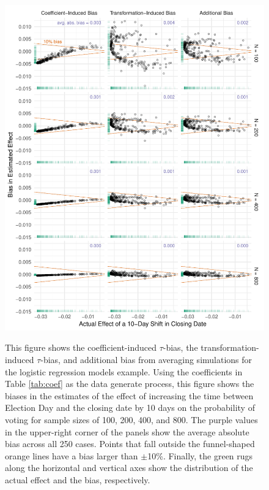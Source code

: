 \documentclass[11pt]{article}
\begin{document}
\begin{figure}[h]
\begin{center}
\includegraphics[scale = 0.75]{figs/nagler-fd-bias.pdf}\\
\vspace{.1in}
\caption{This figure shows the coefficient-induced $\tau$-bias, the transformation-induced $\tau$-bias, and additional bias from averaging simulations for the logistic regression models example. Using the coefficients in Table \ref{tab:coef} as the data generate process, this figure shows the biases in the estimates of the effect of increasing the time between Election Day and the closing date by 10 days on the probability of voting for sample sizes of 100, 200, 400, and 800. The purple values in the upper-right corner of the panels show the average absolute bias across all 250 cases. Points that fall outside the funnel-shaped orange lines have a bias larger than $\pm$10\%. Finally, the green rugs along the horizontal and vertical axes show the distribution of the actual effect and the bias, respectively.}\label{fig:nagler}
\end{center}
\end{figure}
\end{document}
